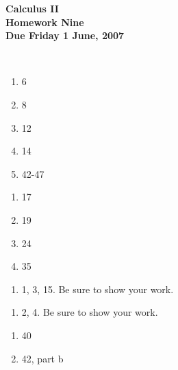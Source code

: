 \documentclass[12pt]{article}
\begin{document}
\pagestyle{empty}
 
\begin{center}
{\large {\bf Calculus II}}\\
\medskip
{\large {\bf Homework Nine}}\\
\medskip
{ {\bf Due Friday 1 June, 2007}}\\
\end{center}

\hspace{2mm}\\


\begin{enumerate}
\setlength{\itemsep}{-1mm}
\item 6
\item 8
\item 12
\item 14
\item 42-47
\end{enumerate}


\begin{enumerate}
\setlength{\itemsep}{-1mm}
\item 17
\item 19
\item 24
\item 35
\end{enumerate}




\begin{enumerate}
\setlength{\itemsep}{-1mm}
\item 1, 3, 15.  Be sure to show your work.
\end{enumerate}


\begin{enumerate}
\setlength{\itemsep}{-1mm}
\item 2, 4.  Be sure to show your work.
\end{enumerate}


\begin{enumerate}
\setlength{\itemsep}{-1mm}
\item 40 
\item 42, part b
\end{enumerate}
\end{document}
